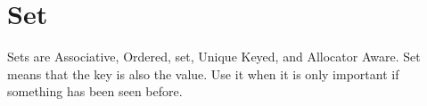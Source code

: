 \section{Set}
Sets are Associative, Ordered, set, Unique Keyed, and Allocator Aware\cite{cplusplus}.  Set means that the key is also the value. Use it when it is only important if something has been seen before.


